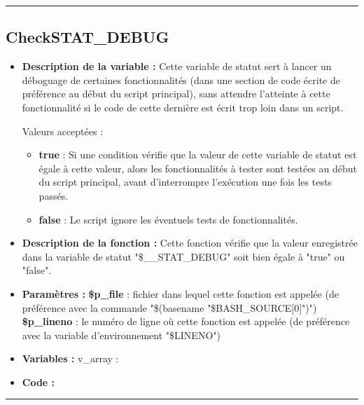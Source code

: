 \documentclass[a4paper,10pt]{article}
\begin{document}
\color{green}\par\noindent\rule{\textwidth}{0.4pt}\color{white}

\color{green}
\subsection{CheckSTAT\_DEBUG}\color{white}
\begin{itemize}
    \item \textbf{Description de la variable :} Cette variable de statut sert à lancer un déboguage de certaines fonctionnalités (dans une section de code écrite de préférence au début du script principal), sans attendre l'atteinte à cette fonctionnalité si le code de cette dernière est écrit trop loin dans un script.
    
    Valeurs acceptées :
    \begin{itemize}
        \item \textbf{true} : Si une condition vérifie que la valeur de cette variable de statut est égale à cette valeur, alors les fonctionnalités à tester sont testées au début du script principal, avant d'interrompre l'exécution une fois les tests passés.
        \item \textbf{false} : Le script ignore les éventuels tests de fonctionnalités. 
    \end{itemize}

    \item \textbf{Description de la fonction :} Cette fonction vérifie que la valeur enregistrée dans la variable de statut "\$\_\_STAT\_DEBUG" soit bien égale à "true" ou "false".

    \item \textbf{Paramètres :}
        \color{orange}\textbf{\$p\_file}\color{white} : fichier dans lequel cette fonction est appelée (de préférence avec la commande "\$(\color{gray}basename \color{white}"\color{orange}\$BASH\_SOURCE[0]\color{white}")")
    \color{orange}\textbf{\$p\_lineno}\color{white} : le numéro de ligne où cette fonction est appelée (de préférence avec la variable d'environnement "\color{orange}\$LINENO\color{white}")

    \item \textbf{Variables :} v\_array :

    \item \textbf{Code :}
\end{itemize}



\color{green}\par\noindent\rule{\textwidth}{0.4pt}\color{white}
\end{document}
